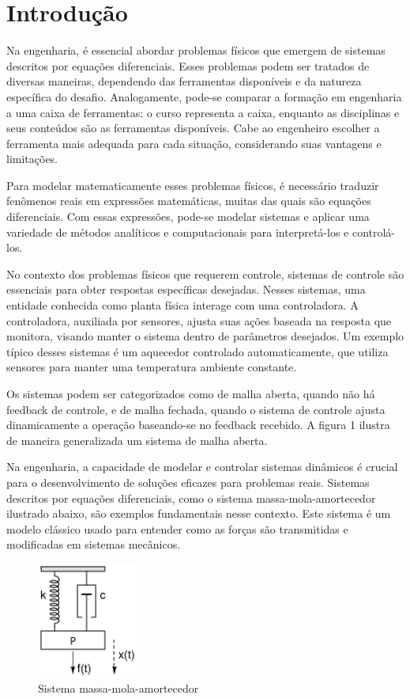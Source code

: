 \section{Introdução}
Na engenharia, é essencial abordar problemas físicos que emergem de sistemas descritos por equações diferenciais. Esses problemas podem ser tratados de diversas maneiras, dependendo das ferramentas disponíveis e da natureza específica do desafio. Analogamente, pode-se comparar a formação em engenharia a uma caixa de ferramentas: o curso representa a caixa, enquanto as disciplinas e seus conteúdos são as ferramentas disponíveis. Cabe ao engenheiro escolher a ferramenta mais adequada para cada situação, considerando suas vantagens e limitações.

Para modelar matematicamente esses problemas físicos, é necessário traduzir fenômenos reais em expressões matemáticas, muitas das quais são equações diferenciais. Com essas expressões, pode-se modelar sistemas e aplicar uma variedade de métodos analíticos e computacionais para interpretá-los e controlá-los.

No contexto dos problemas físicos que requerem controle, sistemas de controle são essenciais para obter respostas específicas desejadas. Nesses sistemas, uma entidade conhecida como planta física interage com uma controladora. A controladora, auxiliada por sensores, ajusta suas ações baseada na resposta que monitora, visando manter o sistema dentro de parâmetros desejados. Um exemplo típico desses sistemas é um aquecedor controlado automaticamente, que utiliza sensores para manter uma temperatura ambiente constante.

Os sistemas podem ser categorizados como de malha aberta, quando não há feedback de controle, e de malha fechada, quando o sistema de controle ajusta dinamicamente a operação baseando-se no feedback recebido. A figura 1 ilustra de maneira generalizada um sistema de malha aberta.


Na engenharia, a capacidade de modelar e controlar sistemas dinâmicos é crucial para o desenvolvimento de soluções eficazes para problemas reais. Sistemas descritos por equações diferenciais, como o sistema massa-mola-amortecedor ilustrado abaixo, são exemplos fundamentais nesse contexto. Este sistema é um modelo clássico usado para entender como as forças são transmitidas e modificadas em sistemas mecânicos.

\begin{figure}[H]
    \centering
    \includegraphics[width=0.3\textwidth]{main/introducao/assets/modelagem.png}
    \caption{Sistema massa-mola-amortecedor}
    \label{fig:modelagem}
\end{figure}


